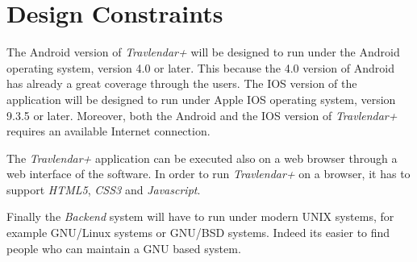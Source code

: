 \section{Design Constraints}
The Android version of \emph{Travlendar+} will be designed to run under the Android operating system, version 4.0 or later. This because the 4.0 version of Android has already a great coverage through the users.
The IOS version of the application will be designed to run under Apple IOS operating system, version 9.3.5 or later.
Moreover, both the Android and the IOS version of \emph{Travlendar+} requires an available Internet connection.

The \emph{Travlendar+} application can be executed also on a web browser through a web interface of the software. In order to run \emph{Travlendar+} on a browser, it has to support \emph{HTML5}, \emph{CSS3} and \emph{Javascript}.

Finally the \emph{Backend} system will have to run under modern UNIX systems, for example GNU/Linux systems or GNU/BSD systems. Indeed its easier to find people who can maintain a GNU based system.